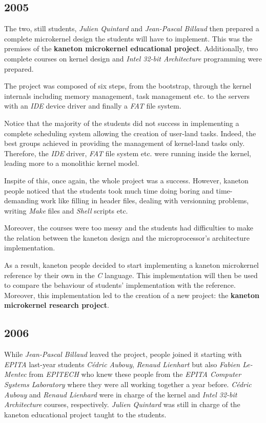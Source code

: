 \begin{multicols}{2}
%
%

\subsection{2005}

The two, still students, \textit{Julien Quintard} and \textit{Jean-Pascal
Billaud} then prepared a complete microkernel design the students will have
to implement. This was the premises of the \textbf{kaneton microkernel
educational project}. Additionally, two complete courses on kernel design and
\textit{Intel 32-bit Architecture} programming were prepared.

The project was composed of six steps, from the bootstrap, through the
kernel internals including memory management, task management etc.
to the servers with an \textit{IDE} device driver and finally a \textit{FAT}
file system.

Notice that the majority of the students did not success in implementing a
complete scheduling system allowing the creation of user-land tasks. Indeed,
the best groups achieved in providing the management of kernel-land tasks only.
Therefore, the \textit{IDE} driver, \textit{FAT} file system etc. were
running inside the kernel, leading more to a monolithic kernel model.

Inspite of this, once again, the whole project was a success. However,
kaneton people noticed that the students took much time doing boring and
time-demanding work like filling in header files, dealing with versionning
problems, writing \textit{Make} files and \textit{Shell} scripts etc.

Moreover, the courses were too messy and the students had difficulties
to make the relation between the kaneton design and the microprocessor's
architecture implementation.

As a result, kaneton people decided to start implementing a kaneton microkernel
reference by their own in the \textit{C} language. This implementation will
then be used to compare the behaviour of students' implementation with
the reference. Moreover, this implementation led to the creation of a
new project: the \textbf{kaneton microkernel research project}.

%
%

\subsection{2006}

While \textit{Jean-Pascal Billaud} leaved the project, people joined it
starting with \textit{EPITA} last-year students \textit{C\'edric Aubouy},
\textit{Renaud Lienhart} but also \textit{Fabien Le-Mentec} from
\textit{EPITECH} who knew these people from the \textit{EPITA Computer Systems
Laboratory} where they were all working together a year before.
\textit{C\'edric Aubouy} and \textit{Renaud Lienhard} were in charge of the
kernel and \textit{Intel 32-bit Architecture} courses, respectively.
\textit{Julien Quintard} was still in charge of the kaneton educational
project taught to the students.


\end{multicols}

